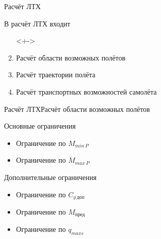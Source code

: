 \begin{frame}{Расчёт ЛТХ}
\begin{block}{В расчёт ЛТХ входит}
   \begin{enumerate}
    \item [] <+->
    \item <+-> Расчёт области возможных полётов
    \item <+-> Расчёт траектории полёта 
    \item <+-> Расчёт транспортных возможностей самолёта
   \end{enumerate}
\end{block}
\end{frame}

\begin{frame}{Расчёт ЛТХ}{Расчёт области возможных полётов}

    \begin{block}{Основные ограничения}
        \begin{itemize}
            \item Ограничение по $M_{min \ P}$ 
            \item Ограничение по $M_{max \ P}$
        \end{itemize}
    \end{block}

    \begin{block}{Дополнительные ограничения}
        \begin{itemize}
            \item Ограничение по $C_{y \ \text{доп}}$
            \item Ограничение по $M_\text{пред}$
            \item Ограничение по $q_{maxs}$
        \end{itemize}
    \end{block}

\end{frame}

